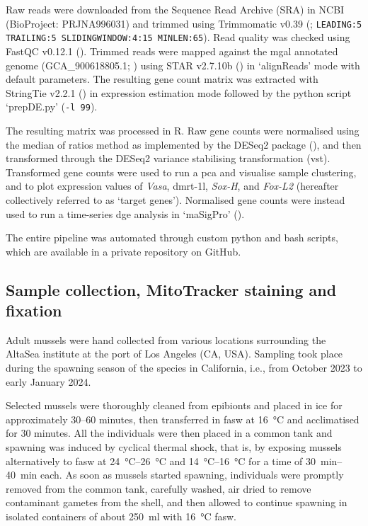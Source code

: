 Raw reads were downloaded from the Sequence Read Archive (SRA) in NCBI (BioProject: PRJNA996031) and trimmed using Trimmomatic v0.39 (; \verb|LEADING:5| \verb|TRAILING:5 SLIDINGWINDOW:4:15 MINLEN:65|). Read quality was checked using FastQC v0.12.1 (). Trimmed reads were mapped against the \gls{mgal} annotated genome (GCA\_900618805.1; ) using STAR v2.7.10b () in ‘alignReads’ mode with default parameters. The resulting gene count matrix was extracted with StringTie v2.2.1 () in expression estimation mode followed by the python script ‘prepDE.py’ (\verb|-l 99|).

The resulting matrix was processed in R. Raw gene counts were normalised using the median of ratios method as implemented by the DESeq2 package (), and then transformed through the DESeq2 variance stabilising transformation (vst). Transformed gene counts were used to run a \gls{pca} and visualise sample clustering, and to plot expression values of \textit{Vasa}, \gls{dmrt-1l}, \textit{Sox-H}, and \textit{Fox-L2} (hereafter collectively referred to as ‘target genes’). Normalised gene counts were instead used to run a time-series \gls{dge} analysis in ‘maSigPro’ ().

The entire pipeline was automated through custom python and bash scripts, which are available in a private repository on GitHub.

\subsection{Sample collection, MitoTracker staining and fixation}
Adult mussels were hand collected from various locations surrounding the AltaSea institute at the port of Los Angeles (CA, USA). Sampling took place during the spawning season of the species in California, i.e., from October 2023 to early January 2024.

Selected mussels were thoroughly cleaned from epibionts and placed in ice for approximately 30--60 minutes, then transferred in \gls{fasw} at \qty{16}{\degreeCelsius} and acclimatised for 30 minutes. All the individuals were then placed in a common tank and spawning was induced by cyclical thermal shock, that is, by exposing mussels alternatively to \gls{fasw} at \qtyrange{24}{26}{\degreeCelsius} and \qtyrange{14}{16}{\degreeCelsius} for a time of \qtyrange{30}{40}{\minute} each. As soon as mussels started spawning, individuals were promptly removed from the common tank, carefully washed, air dried to remove contaminant gametes from the shell, and then allowed to continue spawning in isolated containers of about \qty{250}{\ml} with \qty{16}{\degreeCelsius} \gls{fasw}.

